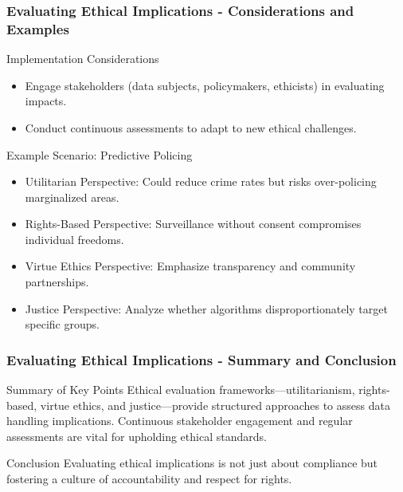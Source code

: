\documentclass[aspectratio=169]{beamer}
\begin{document}
\begin{frame}[fragile]
    \frametitle{Evaluating Ethical Implications - Considerations and Examples}
    \begin{block}{Implementation Considerations}
        \begin{itemize}
            \item Engage stakeholders (data subjects, policymakers, ethicists) in evaluating impacts.
            \item Conduct continuous assessments to adapt to new ethical challenges.
        \end{itemize}
    \end{block}
    
    \begin{block}{Example Scenario: Predictive Policing}
        \begin{itemize}
            \item Utilitarian Perspective: Could reduce crime rates but risks over-policing marginalized areas.
            \item Rights-Based Perspective: Surveillance without consent compromises individual freedoms.
            \item Virtue Ethics Perspective: Emphasize transparency and community partnerships.
            \item Justice Perspective: Analyze whether algorithms disproportionately target specific groups.
        \end{itemize}
    \end{block}
\end{frame}

\begin{frame}[fragile]
    \frametitle{Evaluating Ethical Implications - Summary and Conclusion}
    \begin{block}{Summary of Key Points}
        Ethical evaluation frameworks—utilitarianism, rights-based, virtue ethics, and justice—provide structured approaches to assess data handling implications.
        Continuous stakeholder engagement and regular assessments are vital for upholding ethical standards.
    \end{block}
    \begin{block}{Conclusion}
        Evaluating ethical implications is not just about compliance but fostering a culture of accountability and respect for rights.
    \end{block}
\end{frame}
\end{document}
